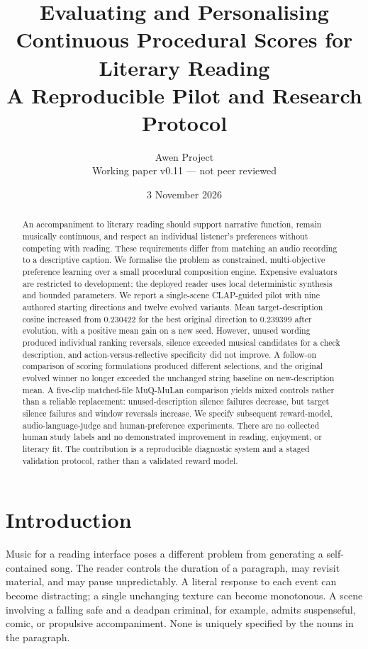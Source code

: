 \documentclass[11pt]{article}
\title{Evaluating and Personalising Continuous Procedural Scores for Literary Reading\\[5pt]\large A Reproducible Pilot and Research Protocol}
\author{Awen Project\\\small Working paper v0.11 --- not peer reviewed}
\date{3 November 2026}
\begin{document}
\maketitle
\begin{abstract}
An accompaniment to literary reading should support narrative function, remain musically continuous, and respect an individual listener's preferences without competing with reading. These requirements differ from matching an audio recording to a descriptive caption. We formalise the problem as constrained, multi-objective preference learning over a small procedural composition engine. Expensive evaluators are restricted to development; the deployed reader uses local deterministic synthesis and bounded parameters. We report a single-scene CLAP-guided pilot with nine authored starting directions and twelve evolved variants. Mean target-description cosine increased from 0.230422 for the best original direction to 0.239399 after evolution, with a positive mean gain on a new seed. However, unused wording produced individual ranking reversals, silence exceeded musical candidates for a check description, and action-versus-reflective specificity did not improve. A follow-on comparison of scoring formulations produced different selections, and the original evolved winner no longer exceeded the unchanged string baseline on new-description mean. A five-clip matched-file MuQ-MuLan comparison yields mixed controls rather than a reliable replacement: unused-description silence failures decrease, but target silence failures and window reversals increase. We specify subsequent reward-model, audio-language-judge and human-preference experiments. There are no collected human study labels and no demonstrated improvement in reading, enjoyment, or literary fit. The contribution is a reproducible diagnostic system and a staged validation protocol, rather than a validated reward model.
\end{abstract}

\section{Introduction}
Music for a reading interface poses a different problem from generating a self-contained song. The reader controls the duration of a paragraph, may revisit material, and may pause unpredictably. A literal response to each event can become distracting; a single unchanging texture can become monotonous. A scene involving a falling safe and a deadpan criminal, for example, admits suspenseful, comic, or propulsive accompaniment. None is uniquely specified by the nouns in the paragraph.
\end{document}
